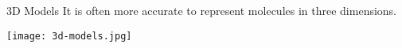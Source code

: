\documentclass[handout]{beamer}
\begin{document}

\begin{frame}{3D Models}
	It is often more accurate to represent molecules in three dimensions.

	\bigskip

	\texttt{[image: 3d-models.jpg]}
\end{frame}
\end{document}
